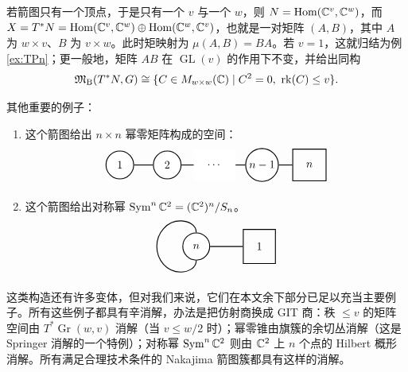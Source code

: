\begin{ex}\label{ex:Gr}
  若箭图只有一个顶点，于是只有一个 $v$ 与一个 $w$，则 $N=\operatorname{Hom}(\mathbb{C}^v,\mathbb{C}^w)$，而 $X=T^*N=\operatorname{Hom}(\mathbb{C}^v,\mathbb{C}^w)\oplus \operatorname{Hom}(\mathbb{C}^w,\mathbb{C}^v)$，也就是一对矩阵 $(A,B)$，其中 $A$ 为 $w\times v$、$B$ 为 $v\times w$。此时矩映射为
$\mu(A,B)=BA$。若 $v=1$，这就归结为例 \ref{ex:TPn}；更一般地，矩阵 $AB$ 在 $\operatorname{GL}(v)$ 的作用下不变，并给出同构
\[\mathfrak{M}_{\operatorname{B}}(T^*N,G)\cong \{C\in M_{w\times w}(\mathbb{C}) \mid C^2=0,\ \operatorname{rk}(C)\leq v\}.\]
\end{ex} 
 
其他重要的例子：
\begin{enumerate}
    \item[E1.] 这个箭图给出 $n\times n$ 幂零矩阵构成的空间：\begin{equation*}
\tikz{
	\node[draw, thick, circle, inner sep=6pt,fill=white] (a) at (-4.5,0) {$1$};
	\node[draw, thick, circle, inner sep=6pt,fill=white] (b) at (-3,0) {$2$};	
		\node[draw, thick, circle, inner sep=2pt,fill=white] (d) at (0,0) {$n-1$};
	\node[draw, thick,inner sep=12pt] (s) at (1.5,0){$n$};
	\node[inner sep=12pt,fill=white] (c) at (-1.5,0){$\cdots$};
		\draw[thick] (a) -- (b) ;
		\draw[thick] (b) -- (c) ;
		\draw[thick] (c) -- (d) ;
		\draw[thick] (d) -- (s) ;
}
\end{equation*}

\item[E2.] 这个箭图给出对称幂 $\operatorname{Sym}^n\mathbb{C}^2=(\mathbb{C}^2)^n/S_n$。
\begin{equation*}
\tikz{
		\node[draw, thick, circle, inner sep=6pt,fill=white] (d) at (0,0) {$n$};
	\node[draw, thick,inner sep=12pt] (s) at (2,0){$1$};
		\draw[thick] (d.north) to[out=90,in=0] (-.5,.8) to[out=180,in=90] (-1.25,0) to[out=-90,in=180] (-.5,-.8) to[out=0,in=-90] (d.south) ;
		\draw[thick] (d) -- (s) ;
}\end{equation*}

\end{enumerate}

这类构造还有许多变体，但对我们来说，它们在本文余下部分已足以充当主要例子。所有这些例子都具有辛消解，办法是把仿射商换成 GIT 商：秩 $\leq v$ 的矩阵空间由 $T^*\operatorname{Gr}(w,v)$ 消解（当 $v\leq w/2$ 时）；幂零锥由旗簇的余切丛消解（这是 Springer 消解的一个特例）；对称幂 $\operatorname{Sym}^n\mathbb{C}^2$ 则由 $\mathbb{C}^2$ 上 $n$ 个点的 Hilbert 概形消解。所有满足合理技术条件的 Nakajima 箭图簇都具有这样的消解。
